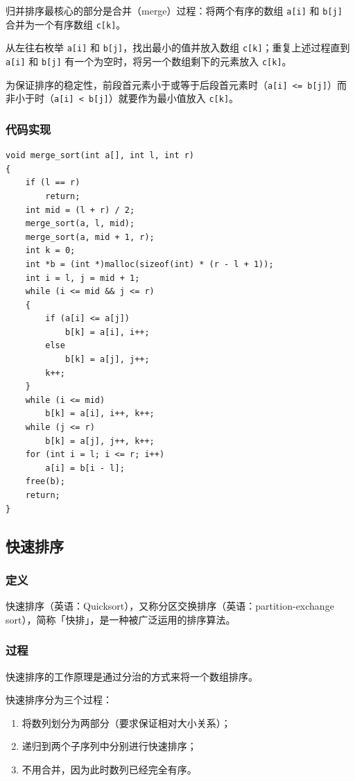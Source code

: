 \documentclass[12pt]{article}
\begin{document}
归并排序最核心的部分是合并（merge）过程：将两个有序的数组 \verb|a[i]| 和 \verb|b[j]| 合并为一个有序数组 \verb|c[k]|。

从左往右枚举 \verb|a[i]| 和 \verb|b[j]|，找出最小的值并放入数组 \verb|c[k]|；重复上述过程直到 \verb|a[i]| 和 \verb|b[j]| 有一个为空时，将另一个数组剩下的元素放入 \verb|c[k]|。

为保证排序的稳定性，前段首元素小于或等于后段首元素时（\verb|a[i] <= b[j]|）而非小于时（\verb|a[i] < b[j]|）就要作为最小值放入 \verb|c[k]|。

\subsubsection{代码实现}

{\setmainfont{Consolas} %
\begin{lstlisting}
void merge_sort(int a[], int l, int r)
{
    if (l == r)
        return;
    int mid = (l + r) / 2;
    merge_sort(a, l, mid);
    merge_sort(a, mid + 1, r);
    int k = 0;
    int *b = (int *)malloc(sizeof(int) * (r - l + 1));
    int i = l, j = mid + 1;
    while (i <= mid && j <= r)
    {
        if (a[i] <= a[j])
            b[k] = a[i], i++;
        else
            b[k] = a[j], j++;
        k++;
    }
    while (i <= mid)
        b[k] = a[i], i++, k++;
    while (j <= r)
        b[k] = a[j], j++, k++;
    for (int i = l; i <= r; i++)
        a[i] = b[i - l];
    free(b);
    return;
}
\end{lstlisting}
}

\subsection{快速排序}

\subsubsection{定义}

快速排序（英语：Quicksort），又称分区交换排序（英语：partition-exchange sort），简称「快排」，是一种被广泛运用的排序算法。

\subsubsection{过程}

快速排序的工作原理是通过分治的方式来将一个数组排序。

快速排序分为三个过程：

\begin{enumerate}
    \item 将数列划分为两部分（要求保证相对大小关系）；
    \item 递归到两个子序列中分别进行快速排序；
    \item 不用合并，因为此时数列已经完全有序。
\end{enumerate}
\end{document}
